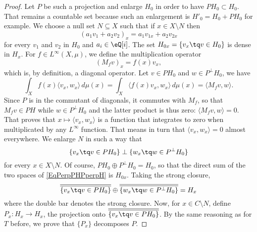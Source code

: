 \begin{proof}
	Let $P$ be such a projection and enlarge $H_0$ in order to have $PH_0\subset H_0$. That remains a countable set because such an enlargement is $H'_0=H_0+PH_0$ for example. We choose a null set $N\subseteq X$ such that if $x\in X\setminus N$ then
	\begin{equation}
		(a_1v_1+a_2v_2)_x=a_1v_{1x}+a_2v_{2x}
	\end{equation}
	for every $v_1$ and $v_2$ in $H_0$ and $a_i\in\eQ[i]$. The set $H_{0x}=\{ v_x\tq v\in H_0 \}$ is dense in $H_x$. For $f\in L^{\infty}(X,\mu)$, we define the multiplication operator
	\begin{equation}
		(M_fv)_x=f(x)v_x,
	\end{equation}
	which is, by definition, a diagonal operator. Let $v\in PH_0$ and $w\in P^{\perp}H_0$, we have
	\begin{equation}
		\int_Xf(x)\langle v_x, w_x\rangle \,d\mu(x)= \int_X\langle f(x) v_x, w_x\rangle \,d\mu(x)=\langle M_fv, w\rangle .
	\end{equation}
	Since $P$ is in the commutant of diagonals, it commutes with $M_f$, so that $M_fv\in PH$ while $w\in P^{\perp}H_0$ and the latter product is thus zero: $\langle M_fv, w\rangle =0$. That proves that $x\mapsto\langle v_x, w_x\rangle $ is a function that integrates to zero when multiplicated by any $L^{\infty}$ function. That means in turn that $\langle v_x, w_x\rangle =0$ almost everywhere. We enlarge $N$ in such a way that
	\begin{equation}		\label{EqPerpPHPperpH}
		\{ v_x\tq v\in PH_0 \}\perp\{ w_x\tq w\in P^{\perp}H_0 \}
	\end{equation}
	for every $x\in X\setminus N$. Of course, $PH_0\oplus P^{\perp}H_0=H_0$, so that the direct sum of the two spaces of \eqref{EqPerpPHPperpH} is $H_{0x}$. Taking the strong closure,
	\begin{equation}
		\overline{ \overline{ \{ v_x\tq v\in PH_0 \} } }\oplus\overline{ \overline{ \{w_x\tq w\in P^{\perp}H_0 \}} }=H_x
	\end{equation}
	where the double bar denotes the strong closure.
	Now, for $x\in C\setminus N$, define $P_x\colon H_x\to H_x$, the projection onto $\overline{ \overline{ \{ v_x\tq v\in PH_0 \} } }$. By the same reasoning as for $T$ before, we prove that $\{ P_x \}$ decomposes $P$.
\end{proof}

